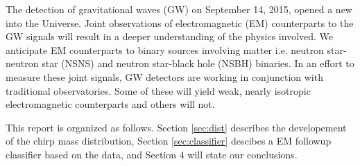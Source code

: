 The detection of gravitational waves (GW) on September 14, 2015, opened a new into the Universe. Joint observations of electromagnetic (EM) counterparts to the GW signals will result in a deeper understanding of the physics involved. We anticipate EM counterparts to binary sources involving matter i.e. neutron star-neutron star (NSNS) and neutron star-black hole (NSBH) binaries. In an effort to measure these joint signals, GW detectors are working in conjunction with traditional observatories. Some of these will yield weak, nearly isotropic electromagnetic counterparts and others will not.

This report is organized as follows. Section \ref{sec:dist} describes the developement of the chirp mass distribution, Section \ref{sec:classifier} descibes a EM followup classifier based on the data, and Section 4 will state our conclusions.
